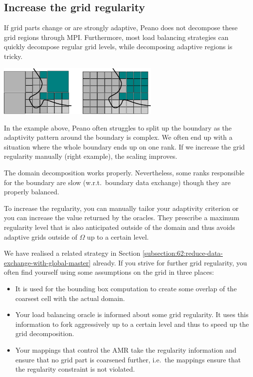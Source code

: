 \subsection{Increase the grid regularity}

If grid parts change or are strongly adaptive, Peano does not decompose these
grid regions through MPI. 
Furthermore, most load balancing strategies can quickly decompose regular grid
levels, while decomposing adaptive regions is tricky.

\begin{center}
  \includegraphics[width=0.6\textwidth]{62_quick-tuning/regularity.pdf}
\end{center}

\noindent
In the example above, Peano often struggles to split up the boundary as the
adaptivity pattern around the boundary is complex.
We often end up with a situation where the whole boundary ends up on one rank.
If we increase the grid regularity manually (right example), the scaling
improves.

\begin{smell}
  The domain decomposition works properly. Nevertheless, some ranks responsible
  for the boundary are slow (w.r.t.~boundary data exchange) though they are
  properly balanced.
\end{smell}

\noindent
To increase the regularity, you can manually tailor your adaptivity criterion or
you can increase the value returned by the oracles.
They prescribe a maximum regularity level that is also anticipated outside of
the domain and thus avoids adaptive grids outside of $\Omega $ up to a certain
level.

We have realised a related strategy in Section
\ref{subsection:62:reduce-data-exchange-with-global-master} already. 
If you strive for further grid regularity, you often find yourself using some
assumptions on the grid in three places:
\begin{itemize}
  \item It is used for the bounding box computation to create some overlap of
  the coarsest cell with the actual domain.
  \item Your load balancing oracle is informed about some grid regularity. It
  uses this information to fork aggressively up to a certain level and thus to
  speed up the grid decomposition.
  \item Your mappings that control the AMR take the regularity information and
  ensure that no grid part is coarsened further, i.e.~the mappings ensure that
  the regularity constraint is not violated.
\end{itemize}

